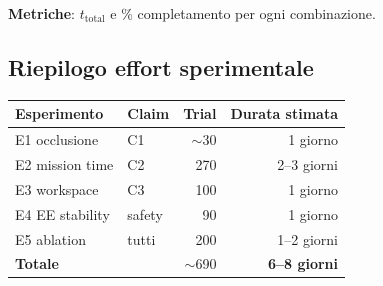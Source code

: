 \documentclass[a4paper,11pt]{article}
\begin{document}
\textbf{Metriche}: $t_{\text{total}}$ e \% completamento per ogni combinazione.

\subsection*{Riepilogo effort sperimentale}

\begin{center}
\begin{tabular}{llrr}
\toprule
Esperimento & Claim & Trial & Durata stimata \\
\midrule
E1 occlusione     & C1       & $\sim$30  & 1 giorno \\
E2 mission time   & C2       & 270       & 2--3 giorni \\
E3 workspace      & C3       & 100       & 1 giorno \\
E4 EE stability   & safety   & 90        & 1 giorno \\
E5 ablation       & tutti    & 200       & 1--2 giorni \\
\midrule
\textbf{Totale}   &          & $\sim$690 & \textbf{6--8 giorni} \\
\bottomrule
\end{tabular}
\end{center}
\end{document}
